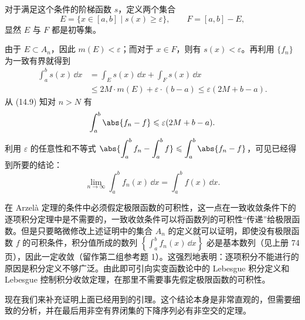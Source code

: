 对于满足这个条件的阶梯函数 $s$，定义两个集合
\[
  E=\{x\in[a,b]\mid s(x)\geqslant\varepsilon\},\qquad F=[a,b]-E,
\]
显然 $E$ 与 $F$ 都是初等集。

由于 $E\subset A_n$，因此 $m(E)<\varepsilon$；而对于 $x\in F$，则有 $s(x)<\varepsilon$。再利用 $\{f_n\}$ 为一致有界就得到
\[
\begin{aligned}
  \int_a^b s(x)\,\dd x
  &=\int_E s(x)\,\dd x+\int_F s(x)\,\dd x\\
  &\leqslant2M\cdot m(E)+\varepsilon\cdot(b-a)\leqslant\varepsilon(2M+b-a).
\end{aligned}
\]
从 (14.9) 知对 $n>N$ 有
\[
  \int_a^b\abs{f_n-f}\leqslant\varepsilon(2M+b-a).
\]
利用 $\varepsilon$ 的任意性和不等式 $\displaystyle\abs{\int_a^b f_n-\int_a^b f}\leqslant\int_a^b\abs{f_n-f}$，可见已经得到所要的结论：
\[
  \lim_{n\to\infty}\int_a^b f_n(x)\,\dd x=\int_a^b f(x)\,\dd x.
\]

\begin{xremark}
在 Arzelà 定理的条件中必须假定极限函数的可积性，这一点在一致收敛条件下的逐项积分定理中是不需要的，一致收敛条件可以将函数列的可积性“传递”给极限函数。但是只要略微修改上述证明中的集合 $A_n$ 的定义就可以证明，即使没有极限函数 $f$ 的可积条件，积分值所成的数列 $\left\{\displaystyle\int_a^b f_n(x)\,\dd x\right\}$ 必是基本数列（见上册 74 页），因此一定收敛（留作第二组参考题 1）。这强烈地表明：逐项积分不能进行的原因是积分定义不够广泛。由此即可引向实变函数论中的 Lebesgue 积分定义和 Lebesgue 控制积分收敛定理，在那里不需要事先假定极限函数的可积性。
\end{xremark}

现在我们来补充证明上面已经用到的引理。这个结论本身是非常直观的，但需要细致的分析，并在最后用非空有界闭集的下降序列必有非空交的定理。

